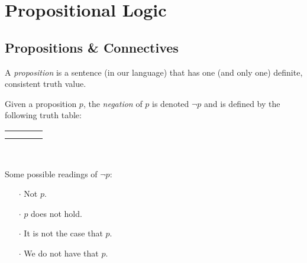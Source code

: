 





\datetrue

\setcounter{chapter}{0}
\chapter{Propositional Logic}

\section{Propositions \& Connectives}

\begin{definition}[Proposition]
    A \emph{proposition} is a sentence (in our language)
    that has one (and only one) definite, consistent truth value.
\end{definition}

\begin{definition}[Negation]
    \begin{center}
        \begin{minipage}[t]{.55\linewidth}
            Given a proposition $p$, the \emph{negation} of $p$
            is denoted $\neg p$ and is defined by the following truth table:
            \begin{table}[H]
                \centering
                \label{tab:not}
                \begin{tabular}{|Cc||Cc|}
                    \hline
                     &  \\ \hline
                    \thead{$\top$} &  \\
                    \thead{$\bot$} &  \\ \hline
                \end{tabular}
            \end{table}
        \end{minipage}%
        \begin{minipage}[t]{.05\linewidth}
            ~
        \end{minipage}%
        \begin{minipage}[t]{.4\linewidth}
            Some possible readings of $\neg p$:\\
            \begin{itemize}
                \item[$\cdot$]
                    Not $p$.
                \item[$\cdot$]
                    $p$ does not hold.
                \item[$\cdot$]
                    It is not the case that $p$.
                \item[$\cdot$]
                    We do not have that $p$.
            \end{itemize}
        \end{minipage}
    \end{center}
\end{definition}

